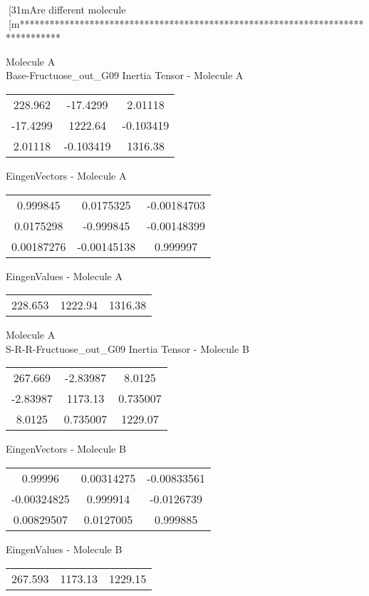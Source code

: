 [31mAre different molecule
[m********************************************************************************
\newpage
\begin{multicols}{2}
\begin{center}
Molecule A \\ 
Base-Fructuose_out_G09
Inertia Tensor - Molecule A \\
\vtab
\begin{tabular}{|c c c|}
228.962	 & 	-17.4299	 & 	2.01118	 \\
-17.4299	 & 	1222.64	 & 	-0.103419	 \\
2.01118	 & 	-0.103419	 & 	1316.38
\end{tabular}

\vtab
 EingenVectors - Molecule A     \\
\vtab
\begin{tabular}{|c c c|}
0.999845	 & 	0.0175325	 & 	-0.00184703	 \\
0.0175298	 & 	-0.999845	 & 	-0.00148399	 \\
0.00187276	 & 	-0.00145138	 & 	0.999997
\end{tabular}

\vtab
 EingenValues - Molecule A     \\
\vtab
\begin{tabular}{|c c c|}
228.653	 & 	1222.94	 & 	1316.38
\end{tabular}
\columnbreak
Molecule A \\ 
S-R-R-Fructuose_out_G09
Inertia Tensor - Molecule B \\
\vtab
\begin{tabular}{|c c c|}
267.669	 & 	-2.83987	 & 	8.0125	 \\
-2.83987	 & 	1173.13	 & 	0.735007	 \\
8.0125	 & 	0.735007	 & 	1229.07
\end{tabular}

\vtab
 EingenVectors - Molecule B     \\
\vtab
\begin{tabular}{|c c c|}
0.99996	 & 	0.00314275	 & 	-0.00833561	 \\
-0.00324825	 & 	0.999914	 & 	-0.0126739	 \\
0.00829507	 & 	0.0127005	 & 	0.999885
\end{tabular}

\vtab
 EingenValues - Molecule B     \\
\vtab
\begin{tabular}{|c c c|}
267.593	 & 	1173.13	 & 	1229.15
\end{tabular}
\end{center}
\end{multicols}
